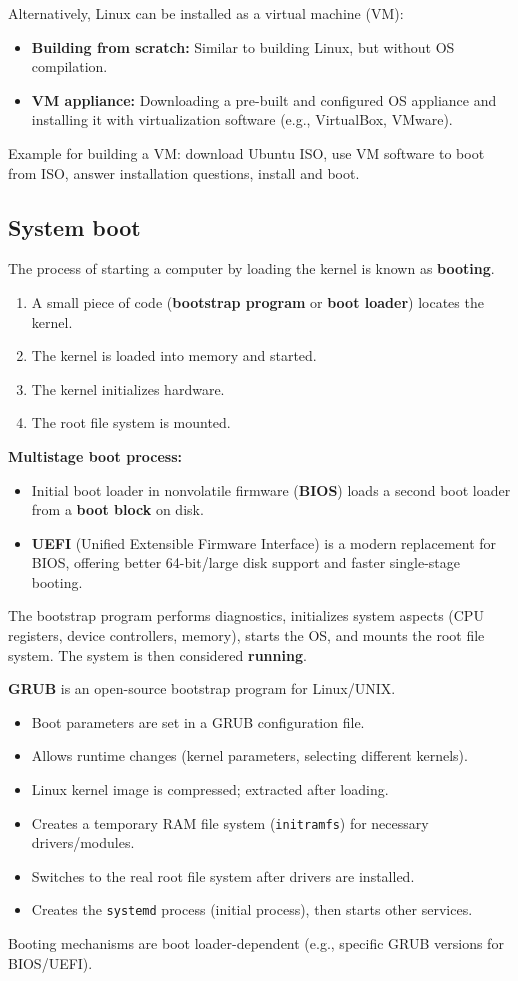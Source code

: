 Alternatively, Linux can be installed as a virtual machine (VM):
\begin{itemize}
    \item \textbf{Building from scratch:} Similar to building Linux, but without OS compilation.
    \item \textbf{VM appliance:} Downloading a pre-built and configured OS appliance and installing it with virtualization software (e.g., VirtualBox, VMware).
\end{itemize}
Example for building a VM: download Ubuntu ISO, use VM software to boot from ISO, answer installation questions, install and boot.

\subsection*{System boot}
The process of starting a computer by loading the kernel is known as \textbf{booting}.
\begin{enumerate}
    \item A small piece of code (\textbf{bootstrap program} or \textbf{boot loader}) locates the kernel.
    \item The kernel is loaded into memory and started.
    \item The kernel initializes hardware.
    \item The root file system is mounted.
\end{enumerate}
\textbf{Multistage boot process:}
\begin{itemize}
    \item Initial boot loader in nonvolatile firmware (\textbf{BIOS}) loads a second boot loader from a \textbf{boot block} on disk.
    \item \textbf{UEFI} (Unified Extensible Firmware Interface) is a modern replacement for BIOS, offering better 64-bit/large disk support and faster single-stage booting.
\end{itemize}
The bootstrap program performs diagnostics, initializes system aspects (CPU registers, device controllers, memory), starts the OS, and mounts the root file system. The system is then considered \textbf{running}.

\textbf{GRUB} is an open-source bootstrap program for Linux/UNIX.
\begin{itemize}
    \item Boot parameters are set in a GRUB configuration file.
    \item Allows runtime changes (kernel parameters, selecting different kernels).
    \item Linux kernel image is compressed; extracted after loading.
    \item Creates a temporary RAM file system (\texttt{initramfs}) for necessary drivers/modules.
    \item Switches to the real root file system after drivers are installed.
    \item Creates the \texttt{systemd} process (initial process), then starts other services.
\end{itemize}
Booting mechanisms are boot loader-dependent (e.g., specific GRUB versions for BIOS/UEFI).

